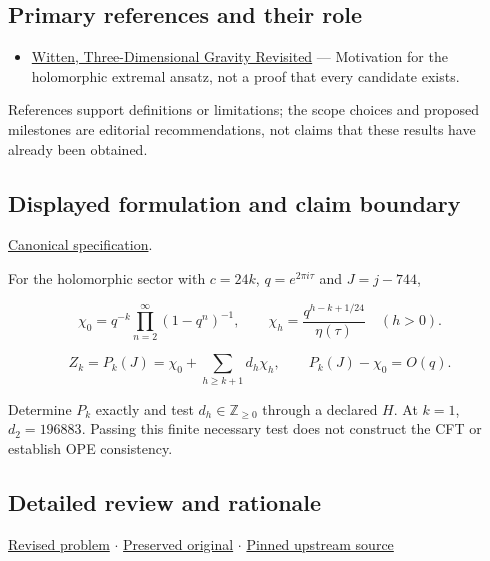\documentclass[
  11pt,
]{article}
\providecommand{\tightlist}{%
  \setlength{\itemsep}{0pt}\setlength{\parskip}{0pt}}
\begin{document}
\subsection{Primary references and their role}

\begin{itemize}
\tightlist
\item
  \href{https://arxiv.org/abs/0706.3359}{Witten, Three-Dimensional
  Gravity Revisited} --- Motivation for the holomorphic extremal ansatz,
  not a proof that every candidate exists.
\end{itemize}

References support definitions or limitations; the scope choices and
proposed milestones are editorial recommendations, not claims that these
results have already been obtained.

\subsection{Displayed formulation and claim boundary}

\href{https://github.com/rick-stevens-ai/Pure-Thought/blob/main/PRDs/01-AdS3-Modular-Bootstrap.md}{Canonical
specification}.

For the holomorphic sector with \(c=24k\), \(q=e^{2\pi i\tau}\) and
\(J=j-744\),

\[\chi_0=q^{-k}\prod_{n=2}^{\infty}(1-q^n)^{-1},\qquad
\chi_h=\frac{q^{h-k+1/24}}{\eta(\tau)}\quad(h>0).\]

\[Z_k=P_k(J)=\chi_0+\sum_{h\ge k+1}d_h\chi_h,\qquad
P_k(J)-\chi_0=O(q).\]

Determine \(P_k\) exactly and test \(d_h\in\mathbb Z_{\ge0}\) through a
declared \(H\). At \(k=1\), \(d_2=196883\). Passing this finite
necessary test does not construct the CFT or establish OPE consistency.

\subsection{Detailed review and rationale}

\href{https://github.com/rick-stevens-ai/Pure-Thought/blob/main/PRDs/01-AdS3-Modular-Bootstrap.md}{Revised
problem} \ensuremath{\cdot}
\href{https://github.com/rick-stevens-ai/Pure-Thought/blob/main/archive/original-PRDs/01-AdS3-Modular-Bootstrap.md}{Preserved
original} \ensuremath{\cdot}
\href{https://github.com/rick-stevens-ai/Pure-Thought/blob/f854d4e12b55c1f5b5c2a964b75f2d23496d981e/PRDs/01-AdS3-Modular-Bootstrap.md}{Pinned
upstream source}
\end{document}

